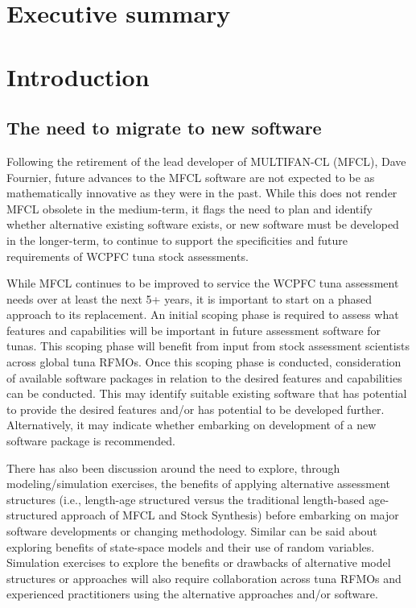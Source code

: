 \documentclass{SCreport}
\begin{document}
\wcpfctitlepage

\tableofcontents
\newpage

\section{Executive summary}

\section{Introduction}

\subsection{The need to migrate to new software}

Following the retirement of the lead developer of MULTIFAN-CL (MFCL), Dave
Fournier, future advances to the MFCL software are not expected to be as
mathematically innovative as they were in the past. While this does not render
MFCL obsolete in the medium-term, it flags the need to plan and identify whether
alternative existing software exists, or new software must be developed in the
longer-term, to continue to support the specificities and future requirements of
WCPFC tuna stock assessments.

While MFCL continues to be improved to service the WCPFC tuna assessment needs
over at least the next 5+ years, it is important to start on a phased approach
to its replacement. An initial scoping phase is required to assess what features
and capabilities will be important in future assessment software for tunas. This
scoping phase will benefit from input from stock assessment scientists across
global tuna RFMOs. Once this scoping phase is conducted, consideration of
available software packages in relation to the desired features and capabilities
can be conducted. This may identify suitable existing software that has
potential to provide the desired features and/or has potential to be developed
further. Alternatively, it may indicate whether embarking on development of a
new software package is recommended.

There has also been discussion around the need to explore, through
modeling/simulation exercises, the benefits of applying alternative assessment
structures (i.e., length-age structured versus the traditional length-based
age-structured approach of MFCL and Stock Synthesis) before embarking on major
software developments or changing methodology. Similar can be said about
exploring benefits of state-space models and their use of random variables.
Simulation exercises to explore the benefits or drawbacks of alternative model
structures or approaches will also require collaboration across tuna RFMOs and
experienced practitioners using the alternative approaches and/or software.
\end{document}
